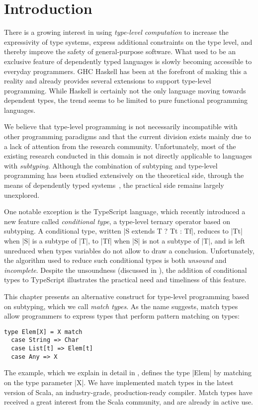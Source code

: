 \section{Introduction}
\label{sec:introduction}

There is a growing interest in using \emph{type-level computation} to increase the expressivity of type systems, express additional constraints on the type level, and thereby improve the safety of general-purpose software.
What used to be an exclusive feature of dependently typed languages is slowly becoming accessible to everyday programmers.
GHC Haskell has been at the forefront of making this a reality and already provides several extensions to support type-level programming.
While Haskell is certainly not the only language moving towards dependent types, the trend seems to be limited to pure functional programming languages.

We believe that type-level programming is not necessarily incompatible with other programming paradigms and that the current division exists mainly due to a lack of attention from the research community.
Unfortunately, most of the existing research conducted in this domain is not directly applicable to languages with \emph{subtyping}.
Although the combination of subtyping and type-level programming has been studied extensively on the theoretical side, through the means of dependently typed systems~\citep{aspinall1994subtyping, zwanenburg1999pure, stone2000deciding, courant2003strong, hutchins2010pure, yang2017unifying}, the practical side remains largely unexplored.

One notable exception is the TypeScript language, which recently introduced a new feature called \emph{conditional type}, a type-level ternary operator based on subtyping.
A conditional type, written |S extends T ? Tt : Tf|, reduces to |Tt| when |S| is a subtype of |T|, to |Tf| when |S| is not a subtype of |T|, and is left unreduced when types variables do not allow to draw a conclusion. Unfortunately, the algorithm used to reduce such conditional types is both \emph{unsound} and \emph{incomplete}.
Despite the unsoundness (discussed in ), the addition of conditional types to TypeScript illustrates the practical need and timeliness of this feature.

This chapter presents an alternative construct for type-level programming based on subtyping, which we call \emph{match types}.
As the name suggests, match types allow programmers to express types that perform pattern matching on types:
%
\begin{lstlisting}
type Elem[X] = X match
  case String => Char
  case List[t] => Elem[t]
  case Any => X
\end{lstlisting}
%
The example, which we explain in detail in , defines the type |Elem| by matching on the type parameter |X|.
%
We have implemented match types in the latest version of Scala, an industry-grade, production-ready compiler.
Match types have received a great interest from the Scala community, and are already in active use.

